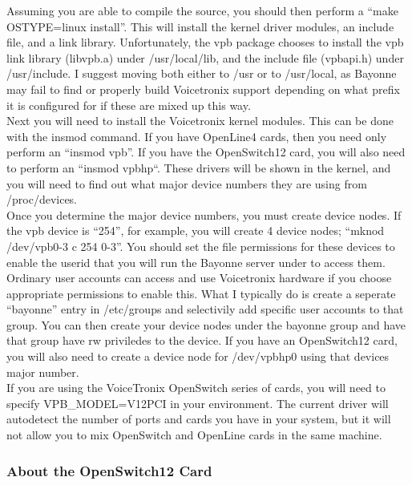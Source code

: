 \documentclass[a4paper,12pt]{article}
\begin{document}
Assuming you are able to compile the source, you should then perform a
``make OSTYPE=linux install''.  This will install the kernel driver
modules, an include file, and a link library.  Unfortunately, the vpb
package chooses to install the vpb link library (libvpb.a) under
/usr/local/lib, and the include file (vpbapi.h) under /usr/include.  I
suggest moving both either to /usr or to /usr/local, as Bayonne may fail
to find or properly build Voicetronix support depending on what prefix it
is configured for if these are mixed up this way. \\

Next you will need to install the Voicetronix kernel modules.  This can be
done with the insmod command.  If you have OpenLine4 cards, then you need
only perform an ``insmod vpb''.  If you have the OpenSwitch12 card, you
will also need to perform an ``insmod vpbhp``.  These drivers will be
shown in the kernel, and you will need to find out what major device
numbers they are using from /proc/devices. \\

Once you determine the major device numbers, you must create device nodes.
If the vpb device is ``254'', for example, you will create 4 device nodes;
``mknod /dev/vpb{0-3} c 254 {0-3}''.  You should set the file permissions
for these devices to enable the userid that you will run the Bayonne
server under to access them.  Ordinary user accounts can access and use
Voicetronix hardware if you choose appropriate permissions to enable
this.  What I typically do is create a seperate ``bayonne'' entry in
/etc/groups and selectivily add specific user accounts to that group.  You
can then create your device nodes under the bayonne group and have that
group have rw priviledes to the device.  If you have an OpenSwitch12 card,
you will also need to create a device node for /dev/vpbhp0 using that
devices major number. \\

If you are using the VoiceTronix OpenSwitch series of cards, you will need
to specify VPB\_MODEL=V12PCI in your environment.  The current driver 
will
autodetect the number of ports and cards you have in your system, but it
will not allow you to mix OpenSwitch and OpenLine cards in the same
machine. \\

\subsubsection{About the OpenSwitch12 Card}
\end{document}
